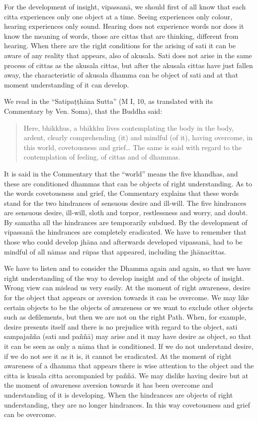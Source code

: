 For the development of insight, vipassanā, we should first of all know that each citta experiences only one object at a time. Seeing experiences only colour, hearing experiences only sound. Hearing does not experience words nor does it know the meaning of words, those are cittas that are thinking, different from hearing. When there are the right conditions for the arising of sati it can be aware of any reality that appears, also of akusala. Sati does not arise in the same process of cittas as the akusala cittas, but after the akusala cittas have just fallen away, the characteristic of akusala dhamma can be object of sati and at that moment understanding of it can develop.

We read in the ``Satipaṭṭhāna Sutta'' (M I, 10, as translated with its Commentary by Ven. Soma), that the Buddha said:
\begin{quote}
Here, bhikkhus, a bhikkhu lives contemplating the body in the body, ardent, clearly comprehending (it) and mindful (of it), having overcome, in this world, covetousness and grief\ldots 
The same is said with regard to the contemplation of feeling, of cittas and of dhammas.
\end{quote}

It is said in the Commentary that the ``world'' means the five khandhas, and these are conditioned dhammas that can be objects of right understanding. As to the words covetousness and grief, the Commentary explains that these words stand for the two hindrances of sensuous desire and ill-will. The five hindrances are sensuous desire, ill-will, sloth and torpor, restlessness and worry, and doubt. By samatha all the hindrances are temporarily subdued. By the development of vipassanā the hindrances are completely eradicated. We have to remember that those who could develop jhāna and afterwards developed vipassanā, had to be mindful of all nāmas and rūpas that appeared, including the jhānacittas.

We have to listen and to consider the Dhamma again and again, so that we have right understanding of the way to develop insight and of the objects of insight. Wrong view can mislead us very easily. At the moment of right awareness, desire for the object that appears or aversion towards it can be overcome. We may like certain objects to be the objects of awareness or we want to exclude other objects such as defilements, but then we are not on the right Path. When, for example, desire presents itself and there is no prejudice with regard to the object, sati sampajañña (sati and paññā) may arise and it may have desire as object, so that it can be seen as only a nāma that is conditioned. If we do not understand desire, if we do not see it as it is, it cannot be eradicated. At the moment of right awareness of a dhamma that appears there is wise attention to the object and the citta is kusala citta accompanied by paññā. We may dislike having desire but at the moment of awareness aversion towards it has been overcome and understanding of it is developing. When the hindrances are objects of right understanding, they are no longer hindrances. In this way covetousness and grief can be overcome.

